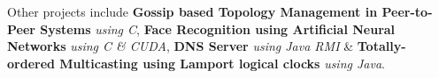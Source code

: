 \documentclass[10pt]{article}
\begin{document}

Other projects include \textbf{Gossip based Topology Management in Peer-to-Peer Systems} \textit{using C}, \textbf{Face Recognition using Artificial Neural Networks} \textit{using C \& CUDA}, 
\textbf{DNS Server} \textit{using Java RMI} \& \textbf{Totally-ordered Multicasting using Lamport logical clocks} \textit{using Java}. 
\end{document}
